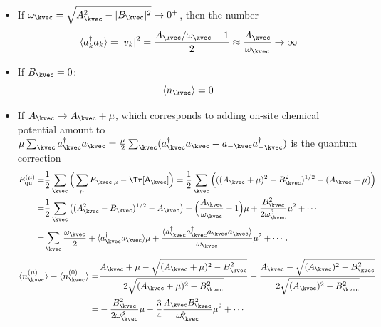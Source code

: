 \begin{itemize}
    \item If $\omega_{\kvec} = \sqrt{A^{2}_{\kvec} - |B_{\kvec}|^{2}} \rightarrow 0^{+}$, then the number 
    \begin{equation}
        \langle a_{k}^{\dagger} a_{k} \rangle = |v_k|^2 = \frac{A_{\kvec}/\omega_{\kvec} - 1}{2} \approx \frac{A_{\kvec}}{\omega_{\kvec}} \rightarrow \infty
    \end{equation}
    \item  If $B_{\kvec} = 0$:
    \begin{equation}
        \langle n_{\kvec} \rangle = 0
    \end{equation}
    \item If $A_{\kvec} \rightarrow A_{\kvec} + \mu$, which corresponds to adding on-site chemical potential amount to $\mu \sum_{\kvec} a_{\kvec}^{\dagger}a_{\kvec} = \frac{\mu}{2} \sum_{\kvec} (a_{\kvec}^{\dagger}a_{\kvec} + a_{-\kvec}a^{\dagger}_{-\kvec} )$ is the quantum correction
    \begin{align*}
        E_{\rm qu}^{(\mu)}
        = & \frac{1}{2} \sum_{\kvec} \Big( \sum_{\mu} E_{\kvec, \mu} - \Tr[\mathsf{A}_{\kvec}]\Big)
        = \frac{1}{2}\sum_{\kvec}  \Big(  ((A_{\kvec} + \mu)^{2} - B_{\kvec}^{2})^{1/2} - (A_{\kvec} + \mu) \Big) \\
        = & \frac{1}{2} \sum_{\kvec} \big( (A_{\kvec}^{2} - B_{\kvec})^{1/2} - A_{\kvec} \big) 
        + \Big( \frac{A_{\kvec}}{\omega_{\kvec}} - 1\Big) \mu 
        + \frac{B_{\kvec}^{2}}{2\omega^{3}_{\kvec}} \mu^{2} + \cdots  \\
        = & \sum_{\kvec} \frac{\omega_{\kvec}}{2} + \langle a_{\kvec}^{\dagger} a_{\kvec} \rangle \mu +  \frac{\langle a_{\kvec}^{\dagger} a_{\kvec}^{\dagger} a_{\kvec} a_{\kvec} \rangle}{\omega_{\kvec}} \mu^{2} + \cdots.
    \end{align*}
    \begin{align*}
        \langle n_{\kvec}^{(\mu)} \rangle - \langle n_{\kvec}^{(0)} \rangle 
        = & \frac{A_{\kvec} + \mu - \sqrt{(A_{\kvec} + \mu)^{2} - B_{\kvec}^{2}}}{2 \sqrt{(A_{\kvec} + \mu)^{2} - B_{\kvec}^{2}} } 
        - \frac{A_{\kvec} - \sqrt{(A_{\kvec})^{2} - B_{\kvec}^{2}}}{2 \sqrt{(A_{\kvec})^{2} - B_{\kvec}^{2}} } \\
        = & - \frac{B_{\kvec}^{2}}{2 \omega^{3}_{\kvec}} \mu - \frac{3}{4} \frac{A_{\kvec}B_{\kvec}^{2}}{\omega_{\kvec}^{5}} \mu^{2} + \cdots
    \end{align*}
\end{itemize}








